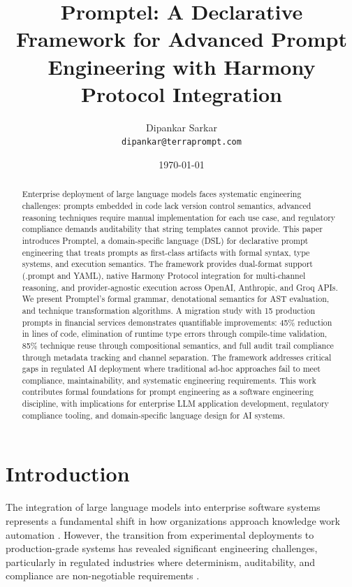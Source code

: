 \documentclass[11pt,a4paper]{article}
\title{\textbf{Promptel: A Declarative Framework for Advanced Prompt Engineering with Harmony Protocol Integration}}
\author{
  Dipankar Sarkar\\
  \texttt{dipankar@terraprompt.com}
}
\date{\today}
\begin{document}
\maketitle

\begin{abstract}
Enterprise deployment of large language models faces systematic engineering challenges: prompts embedded in code lack version control semantics, advanced reasoning techniques require manual implementation for each use case, and regulatory compliance demands auditability that string templates cannot provide. This paper introduces Promptel, a domain-specific language (DSL) for declarative prompt engineering that treats prompts as first-class artifacts with formal syntax, type systems, and execution semantics. The framework provides dual-format support (.prompt and YAML), native Harmony Protocol integration for multi-channel reasoning, and provider-agnostic execution across OpenAI, Anthropic, and Groq APIs. We present Promptel's formal grammar, denotational semantics for AST evaluation, and technique transformation algorithms. A migration study with 15 production prompts in financial services demonstrates quantifiable improvements: 45\% reduction in lines of code, elimination of runtime type errors through compile-time validation, 85\% technique reuse through compositional semantics, and full audit trail compliance through metadata tracking and channel separation. The framework addresses critical gaps in regulated AI deployment where traditional ad-hoc approaches fail to meet compliance, maintainability, and systematic engineering requirements. This work contributes formal foundations for prompt engineering as a software engineering discipline, with implications for enterprise LLM application development, regulatory compliance tooling, and domain-specific language design for AI systems.
\end{abstract}

\section{Introduction}

The integration of large language models into enterprise software systems represents a fundamental shift in how organizations approach knowledge work automation \cite{brown2020language, wei2022chain}. However, the transition from experimental deployments to production-grade systems has revealed significant engineering challenges, particularly in regulated industries where determinism, auditability, and compliance are non-negotiable requirements \cite{bommasani2021opportunities}.
\end{document}

